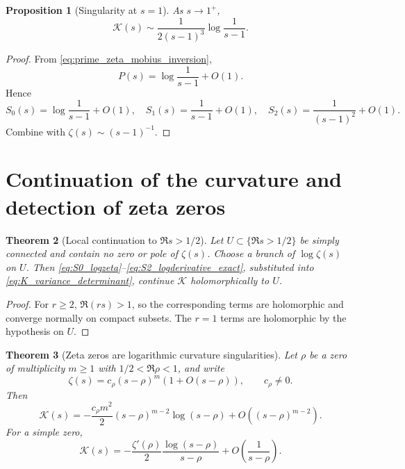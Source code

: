 \documentclass[11pt]{amsart}
\numberwithin{equation}{section}
\theoremstyle{plain}
\newtheorem{theorem}{Theorem}[section]
\newtheorem{proposition}[theorem]{Proposition}
\theoremstyle{definition}
\theoremstyle{remark}
\begin{document}
\begin{proposition}[Singularity at \(s=1\)]
\label{prop:K_near_one}
As \(s\to1^+\),
\begin{equation}
\boxed{
\mathcal K(s)\sim\frac1{2(s-1)^3}\log\frac1{s-1}.}
\label{eq:K_near_one_asymptotic}
\end{equation}
\end{proposition}

\begin{proof}
From \eqref{eq:prime_zeta_mobius_inversion},
\begin{equation}
P(s)=\log\frac1{s-1}+O(1).
\label{eq:P_near_one}
\end{equation}
Hence
\begin{equation}
S_0(s)=\log\frac1{s-1}+O(1),\quad
S_1(s)=\frac1{s-1}+O(1),\quad
S_2(s)=\frac1{(s-1)^2}+O(1).
\label{eq:S012_near_one}
\end{equation}
Combine with \(\zeta(s)\sim(s-1)^{-1}\).
\end{proof}

\section{Continuation of the curvature and detection of zeta zeros}
\label{sec:curvature_zero_detection}

\begin{theorem}[Local continuation to \(\Re s>1/2\)]
\label{thm:K_local_continuation}
Let \(U\subset\{\Re s>1/2\}\) be simply connected and contain no zero or pole
of \(\zeta(s)\). Choose a branch of \(\log\zeta(s)\) on \(U\). Then
\eqref{eq:S0_logzeta}--\eqref{eq:S2_logderivative_exact}, substituted into
\eqref{eq:K_variance_determinant}, continue \(\mathcal K\) holomorphically to
\(U\).
\end{theorem}

\begin{proof}
For \(r\ge2\), \(\Re(rs)>1\), so the corresponding terms are holomorphic and
converge normally on compact subsets. The \(r=1\) terms are holomorphic by the
hypothesis on \(U\).
\end{proof}

\begin{theorem}[Zeta zeros are logarithmic curvature singularities]
\label{thm:zero_curvature_singularity}
Let \(\rho\) be a zero of multiplicity \(m\ge1\) with
\(1/2<\Re\rho<1\), and write
\begin{equation}
\zeta(s)=c_\rho(s-\rho)^m(1+O(s-\rho)),\qquad c_\rho\ne0.
\label{eq:zeta_local_zero_m}
\end{equation}
Then
\begin{equation}
\boxed{
\mathcal K(s)=-\frac{c_\rho m^2}{2}
(s-\rho)^{m-2}\log(s-\rho)
+O\!\left((s-\rho)^{m-2}\right).}
\label{eq:K_zero_local_form}
\end{equation}
For a simple zero,
\begin{equation}
\boxed{
\mathcal K(s)=-\frac{\zeta'(\rho)}2
\frac{\log(s-\rho)}{s-\rho}
+O\!\left(\frac1{s-\rho}\right).}
\label{eq:K_simple_zero_form}
\end{equation}
\end{theorem}
\end{document}
